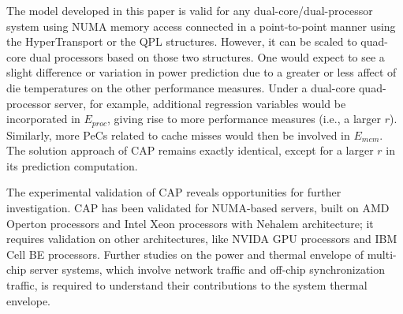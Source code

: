 The model developed in this paper is valid for any
dual-core/dual-processor system using NUMA memory access connected in a
point-to-point manner using the HyperTransport or the QPL structures.
However, it can be scaled to quad-core dual processors based on those
two structures.  One would expect to see a slight difference or
variation in power prediction due to a greater or less affect of die
temperatures on the other performance measures.  Under a dual-core
quad-processor server, for example, additional regression variables
would be incorporated in $E_{proc}$, giving rise to more performance
measures (i.e., a larger $r$).  Similarly, more PeCs related to cache
misses would then be involved in $E_{mem}$.  The solution approach of
CAP remains exactly identical, except for a larger $r$ in its prediction
computation.

The experimental validation of CAP reveals opportunities for further
investigation.  CAP has been validated for NUMA-based servers, built on
AMD Operton processors and Intel Xeon processors with Nehalem
architecture; it requires validation on other architectures, like NVIDA
GPU processors and IBM Cell BE processors.  Further studies on the power
and thermal envelope of multi-chip server systems, which involve network
traffic and off-chip synchronization traffic, is required to understand
their contributions to the system thermal envelope.
